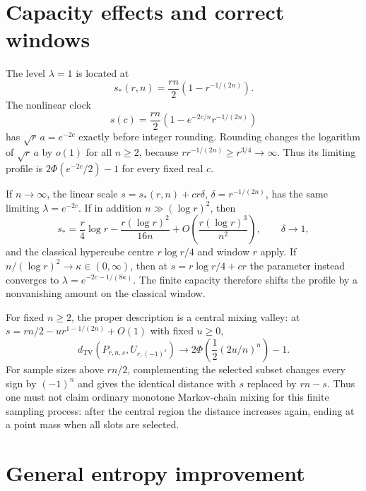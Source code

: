 \documentclass[11pt]{article}
\newcommand{\TV}{d_{\mathrm{TV}}}
\newcommand{\PhiN}{\Phi}
\begin{document}
\section{Capacity effects and correct windows}

The level $\lambda=1$ is located at
\[
 s_*(r,n)=\frac{rn}{2}\left(1-r^{-1/(2n)}\right).
\]
The nonlinear clock
\[
 s(c)=\frac{rn}{2}\left(1-e^{-2c/n}r^{-1/(2n)}\right)
\]
has $\sqrt r\,a=e^{-2c}$ exactly before integer rounding. Rounding changes
the logarithm of $\sqrt r\,a$ by $o(1)$ for all $n\ge2$, because
$r r^{-1/(2n)}\ge r^{3/4}\to\infty$. Thus its limiting profile is
$2\PhiN(e^{-2c}/2)-1$ for every fixed real $c$.

If $n\to\infty$, the linear scale
$s=s_*(r,n)+c r\delta$, $\delta=r^{-1/(2n)}$, has the same limiting
$\lambda=e^{-2c}$. If in addition $n\gg(\log r)^2$, then
\[
 s_* = \frac r4\log r-\frac{r(\log r)^2}{16n}
 +O\left(\frac{r(\log r)^3}{n^2}\right),\qquad\delta\to1,
\]
and the classical hypercube centre $r\log r/4$ and window $r$ apply.
If $n/(\log r)^2\to\kappa\in(0,\infty)$, then at
$s=r\log r/4+cr$ the parameter instead converges to
$\lambda=e^{-2c-1/(8\kappa)}$. The finite capacity therefore shifts the
profile by a nonvanishing amount on the classical window.

For fixed $n\ge2$, the proper description is a central mixing valley:
at $s=rn/2-u r^{1-1/(2n)}+O(1)$ with fixed $u\ge0$,
\[
 \TV(P_{r,n,s},U_{r,(-1)^s})\longrightarrow
 2\PhiN\left(\frac12(2u/n)^n\right)-1.
\]
For sample sizes above $rn/2$, complementing the selected subset changes
every sign by $(-1)^n$ and gives the identical distance with $s$ replaced
by $rn-s$. Thus one must not claim ordinary monotone Markov-chain mixing
for this finite sampling process: after the central region the distance
increases again, ending at a point mass when all slots are selected.

\section{General entropy improvement}
\end{document}

